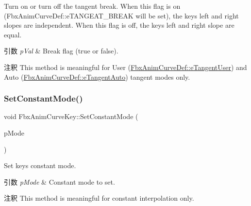 Turn on or turn off the tangent break. When this flag is on (Fbx\+Anim\+Curve\+Def\+::e\+T\+A\+N\+G\+E\+A\+T\+\_\+\+B\+R\+E\+AK will be set), the key\textquotesingle{}s left and right slopes are independent. When this flag is off, the key\textquotesingle{}s left and right slope are equal. 
\begin{DoxyParams}{引数}
{\em p\+Val} & Break flag ({\ttfamily true} or {\ttfamily false}). \\
\hline
\end{DoxyParams}
\begin{DoxyRemark}{注釈}
This method is meaningful for User (\hyperlink{class_fbx_anim_curve_def_ac810ccc5ca0527704ab5175479964b87a199cb16b2c861b12c334093ce796cb86}{Fbx\+Anim\+Curve\+Def\+::e\+Tangent\+User}) and Auto (\hyperlink{class_fbx_anim_curve_def_ac810ccc5ca0527704ab5175479964b87a56e3bad364851277281e94e81327dd25}{Fbx\+Anim\+Curve\+Def\+::e\+Tangent\+Auto}) tangent modes only. 
\end{DoxyRemark}
\mbox{\label{class_fbx_anim_curve_key_a6a34c333a4b4f90cf04492c9c31bedcb}} 
\subsubsection{\texorpdfstring{Set\+Constant\+Mode()}{SetConstantMode()}}
{\footnotesize\ttfamily void Fbx\+Anim\+Curve\+Key\+::\+Set\+Constant\+Mode (\begin{DoxyParamCaption}\item[{\hyperlink{class_fbx_anim_curve_def_a52885abd392ac8ac3da94bafc5fddd64}{Fbx\+Anim\+Curve\+Def\+::\+E\+Constant\+Mode}}]{p\+Mode }\end{DoxyParamCaption})}

Set key\textquotesingle{}s constant mode. 
\begin{DoxyParams}{引数}
{\em p\+Mode} & Constant mode to set. \\
\hline
\end{DoxyParams}
\begin{DoxyRemark}{注釈}
This method is meaningful for constant interpolation only. 
\end{DoxyRemark}
\mbox{\label{class_fbx_anim_curve_key_a39c27002f753b9f743c5883b0c0f6278}} 
